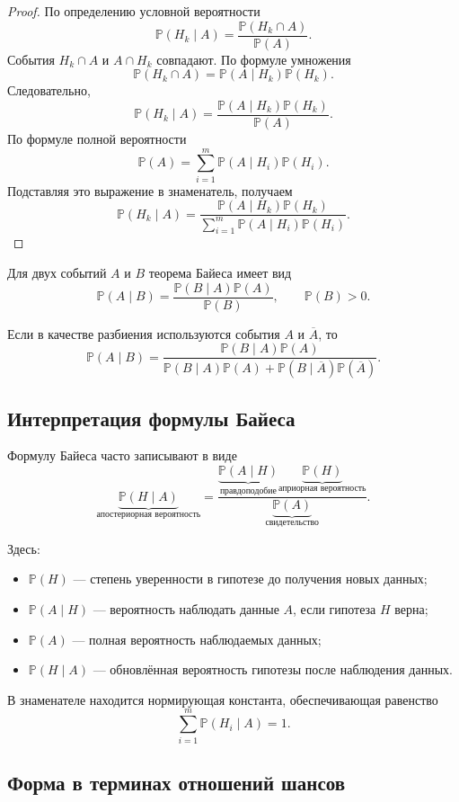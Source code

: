 \documentclass[12pt,a4paper]{article}
\theoremstyle{plain}
\theoremstyle{definition}
\theoremstyle{remark}
\newcommand{\Pp}{\mathbb{P}}
\begin{document}
\begin{proof}
По определению условной вероятности
\[
    \Pp(H_k\mid A)
    =
    \frac{\Pp(H_k\cap A)}{\Pp(A)}.
\]
События $H_k\cap A$ и $A\cap H_k$ совпадают. По формуле умножения
\[
    \Pp(H_k\cap A)
    =
    \Pp(A\mid H_k)\Pp(H_k).
\]
Следовательно,
\[
    \Pp(H_k\mid A)
    =
    \frac{\Pp(A\mid H_k)\Pp(H_k)}
         {\Pp(A)}.
\]
По формуле полной вероятности
\[
    \Pp(A)
    =
    \sum_{i=1}^{m}
    \Pp(A\mid H_i)\Pp(H_i).
\]
Подставляя это выражение в знаменатель, получаем
\[
    \Pp(H_k\mid A)
    =
    \frac{\Pp(A\mid H_k)\Pp(H_k)}
    {\displaystyle
        \sum_{i=1}^{m}\Pp(A\mid H_i)\Pp(H_i)}.
\]
\end{proof}

Для двух событий $A$ и $B$ теорема Байеса имеет вид
\[
    \boxed{
    \Pp(A\mid B)
    =
    \frac{\Pp(B\mid A)\Pp(A)}{\Pp(B)}
    },
    \qquad \Pp(B)>0.
\]

Если в качестве разбиения используются события $A$ и $\overline{A}$, то
\[
    \Pp(A\mid B)
    =
    \frac{\Pp(B\mid A)\Pp(A)}
    {\Pp(B\mid A)\Pp(A)
    +
    \Pp(B\mid \overline{A})\Pp(\overline{A})}.
\]

\subsection{Интерпретация формулы Байеса}

Формулу Байеса часто записывают в виде
\[
    \underbrace{\Pp(H\mid A)}_{\text{апостериорная вероятность}}
    =
    \frac{
        \underbrace{\Pp(A\mid H)}_{\text{правдоподобие}}
        \underbrace{\Pp(H)}_{\text{априорная вероятность}}
    }{
        \underbrace{\Pp(A)}_{\text{свидетельство}}
    }.
\]

Здесь:
\begin{itemize}
    \item $\Pp(H)$ --- степень уверенности в гипотезе до получения новых
    данных;
    \item $\Pp(A\mid H)$ --- вероятность наблюдать данные $A$, если
    гипотеза $H$ верна;
    \item $\Pp(A)$ --- полная вероятность наблюдаемых данных;
    \item $\Pp(H\mid A)$ --- обновлённая вероятность гипотезы после
    наблюдения данных.
\end{itemize}

В знаменателе находится нормирующая константа, обеспечивающая равенство
\[
    \sum_{i=1}^{m}\Pp(H_i\mid A)=1.
\]

\subsection{Форма в терминах отношений шансов}
\end{document}
